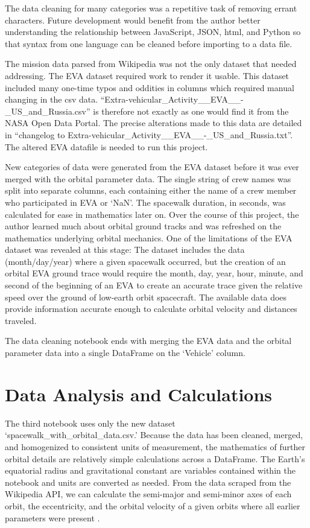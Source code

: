 \documentclass[sigconf]{acmart}
\begin{document}
The data cleaning for many categories was a repetitive task of removing errant characters. Future development would benefit from the author better understanding the relationship between JavaScript, JSON, html, and Python so that syntax from one language can be cleaned before importing to a data file.

The mission data parsed from Wikipedia was not the only dataset that needed addressing. The EVA dataset required work to render it usable. This dataset included many one-time typos and oddities in columns which required manual changing in the csv data. “Extra-vehicular_Activity__EVA__-_US_and_Russia.csv” is therefore not exactly as one would find it from the NASA Open Data Portal. The precise alterations made to this data are detailed in  “changelog to Extra-vehicular_Activity__EVA__-_US_and_Russia.txt”. The altered EVA datafile is needed to run this project. 

New categories of data were generated from the EVA dataset before it was ever merged with the orbital parameter data. The single string of crew names was split into separate columns, each containing either the name of a crew member who participated in EVA or ‘NaN’. The spacewalk duration, in seconds, was calculated for ease in mathematics later on. 
Over the course of this project, the author learned much about orbital ground tracks and was refreshed on the mathematics underlying orbital mechanics. One of the limitations of the EVA dataset was revealed at this stage: The dataset includes the data (month/day/year) where a given spacewalk occurred, but the creation of an orbital EVA ground trace would require the month, day, year, hour, minute, and second of the beginning of an EVA to create an accurate trace given the relative speed over the ground of low-earth orbit spacecraft. The available data does provide information accurate enough to calculate orbital velocity and distances traveled. 

The data cleaning notebook ends with merging the EVA data and the orbital parameter data into a single DataFrame on the ‘Vehicle’ column.

\section{Data Analysis and Calculations}
The third notebook uses only the new dataset ‘spacewalk_with_orbital_data.csv.’ Because the data has been cleaned, merged, and homogenized to consistent units of measurement, the mathematics of further orbital details are relatively simple calculations across a DataFrame.  The Earth’s equatorial radius and gravitational constant \cite{Williams2016} are variables contained within the notebook and units are converted as needed.  
From the data scraped from the Wikipedia API, we can calculate the semi-major and semi-minor axes of each orbit, the eccentricity, and the orbital velocity of a given orbits where all earlier parameters were present \cite{Wolfson2007}. 
\end{document}
